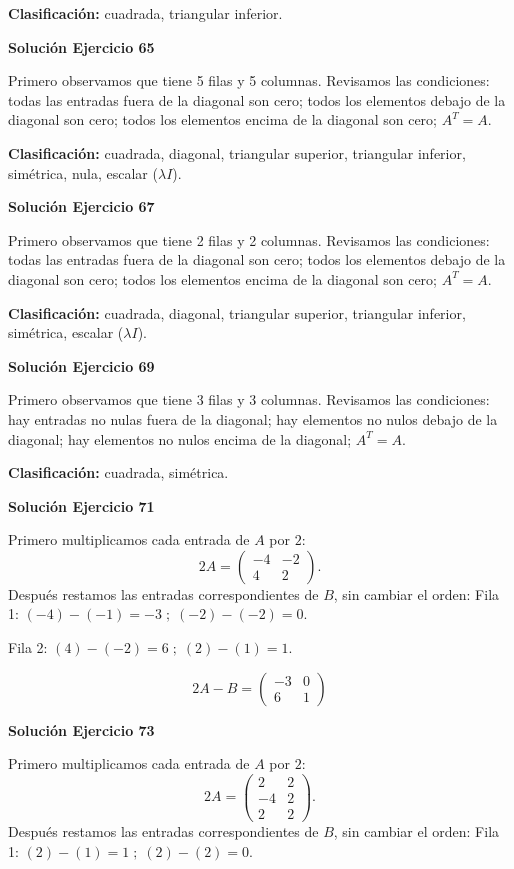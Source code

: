 \textbf{Clasificación:} cuadrada, triangular inferior.


\par\bigskip\noindent\textbf{Solución Ejercicio 65}\par\nobreak
Primero observamos que tiene 5 filas y 5 columnas. Revisamos las condiciones: todas las entradas fuera de la diagonal son cero; todos los elementos debajo de la diagonal son cero; todos los elementos encima de la diagonal son cero; $A^T=A$.

\textbf{Clasificación:} cuadrada, diagonal, triangular superior, triangular inferior, simétrica, nula, escalar ($\lambda I$).


\par\bigskip\noindent\textbf{Solución Ejercicio 67}\par\nobreak
Primero observamos que tiene 2 filas y 2 columnas. Revisamos las condiciones: todas las entradas fuera de la diagonal son cero; todos los elementos debajo de la diagonal son cero; todos los elementos encima de la diagonal son cero; $A^T=A$.

\textbf{Clasificación:} cuadrada, diagonal, triangular superior, triangular inferior, simétrica, escalar ($\lambda I$).


\par\bigskip\noindent\textbf{Solución Ejercicio 69}\par\nobreak
Primero observamos que tiene 3 filas y 3 columnas. Revisamos las condiciones: hay entradas no nulas fuera de la diagonal; hay elementos no nulos debajo de la diagonal; hay elementos no nulos encima de la diagonal; $A^T=A$.

\textbf{Clasificación:} cuadrada, simétrica.


\par\bigskip\noindent\textbf{Solución Ejercicio 71}\par\nobreak
Primero multiplicamos cada entrada de $A$ por $2$:
\[
2A=\begin{pmatrix}-4&-2\\4&2\end{pmatrix}.
\]
Después restamos las entradas correspondientes de $B$, sin cambiar el orden:
Fila 1: $(-4)-(-1)=-3\; ;\; (-2)-(-2)=0$.

Fila 2: $(4)-(-2)=6\; ;\; (2)-(1)=1$.

\[
\boxed{2A-B=\begin{pmatrix}-3&0\\6&1\end{pmatrix}}
\]

\par\bigskip\noindent\textbf{Solución Ejercicio 73}\par\nobreak
Primero multiplicamos cada entrada de $A$ por $2$:
\[
2A=\begin{pmatrix}2&2\\-4&2\\2&2\end{pmatrix}.
\]
Después restamos las entradas correspondientes de $B$, sin cambiar el orden:
Fila 1: $(2)-(1)=1\; ;\; (2)-(2)=0$.

